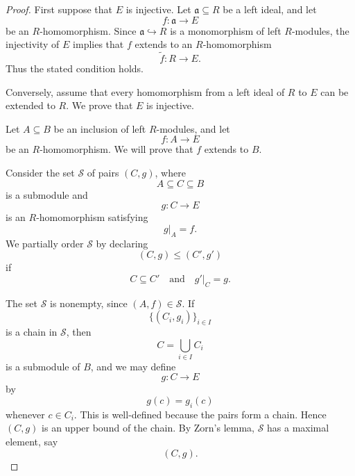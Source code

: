                 \begin{proof}
                First suppose that \(E\) is injective. Let \(\mathfrak a\subseteq R\) be a left ideal,
                and let
                \[
                    f:\mathfrak a\longrightarrow E
                \]
                be an \(R\)-homomorphism. Since \(\mathfrak a\hookrightarrow R\) is a monomorphism
                of left \(R\)-modules, the injectivity of \(E\) implies that \(f\) extends to an
                \(R\)-homomorphism
                \[
                    \widetilde f:R\longrightarrow E.
                \]
                Thus the stated condition holds.
                
                Conversely, assume that every homomorphism from a left ideal of \(R\) to \(E\) can be
                extended to \(R\). We prove that \(E\) is injective.
                
                Let \(A\subseteq B\) be an inclusion of left \(R\)-modules, and let
                \[
                    f:A\longrightarrow E
                \]
                be an \(R\)-homomorphism. We will prove that \(f\) extends to \(B\).
                
                Consider the set \(\mathcal S\) of pairs \((C,g)\), where
                \[
                    A\subseteq C\subseteq B
                \]
                is a submodule and
                \[
                    g:C\longrightarrow E
                \]
                is an \(R\)-homomorphism satisfying
                \[
                    g|_A=f.
                \]
                We partially order \(\mathcal S\) by declaring
                \[
                    (C,g)\leq (C',g')
                \]
                if
                \[
                    C\subseteq C'
                    \quad\text{and}\quad
                    g'|_C=g.
                \]
                
                The set \(\mathcal S\) is nonempty, since \((A,f)\in \mathcal S\). If
                \[
                    \{(C_i,g_i)\}_{i\in I}
                \]
                is a chain in \(\mathcal S\), then
                \[
                    C=\bigcup_{i\in I}C_i
                \]
                is a submodule of \(B\), and we may define
                \[
                    g:C\longrightarrow E
                \]
                by
                \[
                    g(c)=g_i(c)
                \]
                whenever \(c\in C_i\). This is well-defined because the pairs form a chain. Hence
                \((C,g)\) is an upper bound of the chain. By Zorn's lemma, \(\mathcal S\) has a
                maximal element, say
                \[
                    (C,g).
                \]
                

\end{proof}

